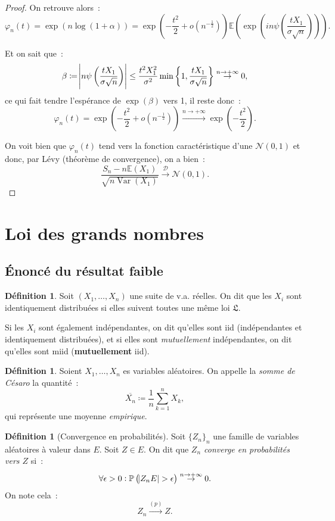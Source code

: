 \documentclass{article}
\newcommand{\E}{\mathbb E}
\renewcommand{\P}{\mathbb P}
\newcommand{\Nzu}{\mathcal N(0, 1)}  %
\newcommand{\convl}{\stackrel{\mathcal D}\to}  %
\newcommand{\Ces}{\overline}  %
\newcommand{\convp}{\stackrel {(p)}\to}  %
\DeclareMathOperator{\Var}{Var}
\theoremstyle{definition}
\newtheorem{déf}[thm]{Définition}
\theoremstyle{remark}
\begin{document}
\begin{proof}
		On retrouve alors~:
		\[\varphi_n(t) = \exp(n\log(1 + \alpha)) = \exp\left(-\frac {t^2}2 + o(n^{-\frac 12})\right)\E\left(\exp\left(in\psi\left(\frac {tX_1}{\sigma \sqrt n}\right)\right)\right).\]

		Et on sait que~:
		\[\beta \coloneqq \abs{n\psi\left(\frac {tX_1}{\sigma\sqrt n}\right)} \leq \frac {t^2X_1^2}{\sigma^2}\min\left\{1, \frac {tX_1}{\sigma\sqrt n}\right\}
			\stackrel {n \to +\infty}\to 0,\]
		ce qui fait tendre l'espérance de $\exp(\beta)$ vers 1, il reste donc~:
		\[\varphi_n(t) = \exp\left(-\frac {t^2}2 + o(n^{-\frac 12})\right) \stackrel {n \to +\infty}\to \exp\left(-\frac {t^2}2\right).\]

		On voit bien que $\varphi_n(t)$ tend vers la fonction caractéristique d'une $\Nzu$ et donc, par Lévy (théorème de convergence), on a bien~:
		\[\frac {S_n - n\E(X_1)}{\sqrt {n\Var(X_1)}} \convl \Nzu.\]
		\end{proof}

\newpage
\section{Loi des grands nombres}
	\subsection{Énoncé du résultat faible}
		\begin{déf} Soit $(X_1, \dotsc, X_n)$ une suite de v.a. réelles. On dit que les $X_i$ sont identiquement distribuées si elles suivent toutes une même
		loi $\mathfrak L$.

		Si les $X_i$ sont également indépendantes, on dit qu'elles sont iid (indépendantes et identiquement distribuées), et si elles sont \emph{mutuellement}
		indépendantes, on dit qu'elles sont miid (\textbf{mutuellement} iid).
		\end{déf}

		\begin{déf} Soient $X_1, \dotsc, X_n$ es variables aléatoires. On appelle la \emph{somme de Césaro} la quantité~:
		\[\Ces{X_n} \coloneqq \frac 1n \sum_{k=1}^nX_k,\]
		qui représente une moyenne \emph{empirique}.
		\end{déf}

		\begin{déf}[Convergence en probabilités] Soit $\{Z_n\}_n$ une famille de variables aléatoires à valeur dans $E$. Soit $Z \in E$. On dit que \emph{$Z_n$
		converge en probabilités vers $Z$} si~:
		\[\forall \epsilon > 0 : \P\left(\abs {Z_n  E} > \epsilon\right) \stackrel {n \to +\infty}\to 0.\]
		On note cela~:
		\[Z_n \convp Z.\]
		\end{déf}
\end{document}
